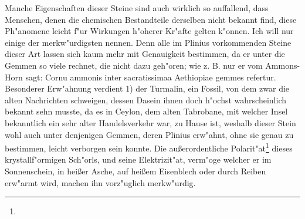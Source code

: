 \documentclass[a4paper, 11pt, oneside, polutonikogreek, german]{article}
\begin{document}
Manche Eigenschaften dieser Steine sind auch wirklich so auffallend, dass Menschen, denen die chemischen Bestandteile derselben nicht bekannt find, diese Ph"anomene leicht f"ur Wirkungen h"oherer Kr"afte gelten k"onnen. Ich will nur einige der merkw"urdigsten nennen. Denn alle im Plinius vorkommenden Steine dieser Art lassen sich kaum mehr mit Genauigkeit bestimmen, da er unter die Gemmen so viele rechnet, die nicht dazu geh"oren; wie z. B. nur er vom Ammons-Horn sagt: Cornu ammonis inter sacratissimaa Aethiopiae gemmes refertur. Besonderer Erw"ahnung verdient 1) der Turmalin, ein Fossil, von dem zwar die alten Nachrichten schweigen, dessen Dasein ihnen doch h"ochst wahrscheinlich bekannt sehn musste, da es in Ceylon, dem alten Tabrobane, mit welcher Insel bekanntlich ein sehr alter Handelsverkehr war, zu Hause ist, weshalb dieser Stein wohl auch unter denjenigen Gemmen, deren Plinius erw"ahnt, ohne sie genau zu bestimmen, leicht verborgen sein konnte. Die außerordentliche Polarit"at\footnote{} dieses krystallf"ormigen Sch"orls, und seine Elektrizit"at, verm"oge welcher er im Sonnenschein, in heißer Asche, auf heißem Eisenblech oder durch Reiben erw"armt wird, machen ihn vorz"uglich merkw"urdig.
\end{document}
